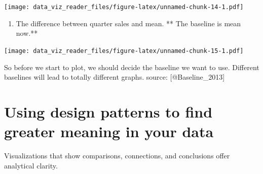 \documentclass[]{book}
\newenvironment{Shaded}{\begin{snugshade}}{\end{snugshade}}
\newcommand{\KeywordTok}[1]{\textcolor[rgb]{0.13,0.29,0.53}{\textbf{#1}}}
\newcommand{\DataTypeTok}[1]{\textcolor[rgb]{0.13,0.29,0.53}{#1}}
\newcommand{\DecValTok}[1]{\textcolor[rgb]{0.00,0.00,0.81}{#1}}
\newcommand{\StringTok}[1]{\textcolor[rgb]{0.31,0.60,0.02}{#1}}
\newcommand{\CommentTok}[1]{\textcolor[rgb]{0.56,0.35,0.01}{\textit{#1}}}
\newcommand{\OtherTok}[1]{\textcolor[rgb]{0.56,0.35,0.01}{#1}}
\newcommand{\ControlFlowTok}[1]{\textcolor[rgb]{0.13,0.29,0.53}{\textbf{#1}}}
\newcommand{\OperatorTok}[1]{\textcolor[rgb]{0.81,0.36,0.00}{\textbf{#1}}}
\newcommand{\NormalTok}[1]{#1}
\providecommand{\tightlist}{%
  \setlength{\itemsep}{0pt}\setlength{\parskip}{0pt}}
\theoremstyle{definition}
\theoremstyle{definition}
\theoremstyle{definition}
\theoremstyle{remark}
\begin{document}
\texttt{[image: data\_viz\_reader\_files/figure-latex/unnamed-chunk-14-1.pdf]}

\begin{enumerate}
\def\labelenumi{\arabic{enumi}.}
\setcounter{enumi}{4}
\tightlist
\item
  The difference between quarter sales and mean. ** The baseline is mean
  now.**
\end{enumerate}

\begin{Shaded}
\end{Shaded}

\texttt{[image: data\_viz\_reader\_files/figure-latex/unnamed-chunk-15-1.pdf]}

So before we start to plot, we should decide the baseline we want to
use. Different baselines will lead to totally different graphs. source:
{[}@Baseline\_2013{]}

\section{Using design patterns to find greater meaning in your
data}\label{using-design-patterns-to-find-greater-meaning-in-your-data}

Visualizations that show comparisons, connections, and conclusions offer
analytical clarity.
\end{document}
